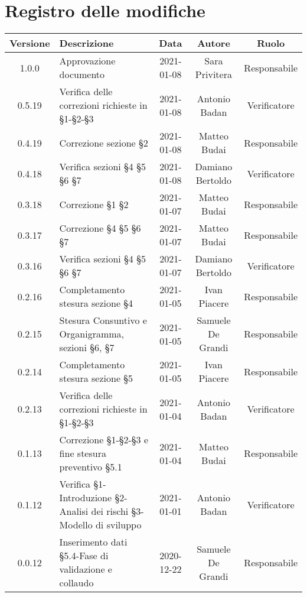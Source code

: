 \section*{Registro delle modifiche}

\begin{center}
	\begin{longtable}{|c|p{5cm}|c|c|c|}
	\hline
	\rowcolor{lighter-grayer}
	\textbf{Versione} & \textbf{Descrizione} & \textbf{Data} & \textbf{Autore} & \textbf{Ruolo} \\
	\hline
	\endfirsthead

	1.0.0 & Approvazione documento & 2021-01-08 & Sara Privitera & Responsabile \\
	\hline
	0.5.19 & Verifica delle correzioni richieste in §1-§2-§3 & 2021-01-08 & Antonio Badan & Verificatore \\
	\hline
	0.4.19 & Correzione sezione §2 & 2021-01-08 & Matteo Budai & Responsabile \\
	\hline
	0.4.18 & Verifica sezioni §4 §5 §6 §7 & 2021-01-08 & Damiano Bertoldo & Verificatore \\
	\hline
	0.3.18 & Correzione §1 §2 & 2021-01-07 & Matteo Budai & Responsabile \\
	\hline
	0.3.17 & Correzione §4 §5 §6 §7 & 2021-01-07 & Matteo Budai & Responsabile \\
	\hline
	0.3.16 & Verifica sezioni §4 §5 §6 §7 & 2021-01-07 & Damiano Bertoldo & Verificatore \\
	\hline
	0.2.16 & Completamento stesura sezione §4 & 2021-01-05 & Ivan Piacere & Responsabile \\
	\hline
	0.2.15 & Stesura Consuntivo e Organigramma, sezioni §6, §7 & 2021-01-05 & Samuele De Grandi & Responsabile \\
	\hline
	0.2.14 & Completamento stesura sezione §5 & 2021-01-05 & Ivan Piacere & Responsabile \\
	\hline
	0.2.13 & Verifica delle correzioni richieste in §1-§2-§3 & 2021-01-04 & Antonio Badan & Verificatore \\
	\hline
	0.1.13 & Correzione §1-§2-§3 e fine stesura preventivo §5.1 & 2021-01-04 & Matteo Budai & Responsabile \\
	\hline
	0.1.12 & Verifica §1-Introduzione §2-Analisi dei rischi §3-Modello di sviluppo & 2021-01-01 & Antonio Badan & Verificatore \\
	\hline
	0.0.12 & Inserimento dati §5.4-Fase di validazione e collaudo & 2020-12-22 & Samuele De Grandi & Responsabile \\

\end{longtable}
\end{center}
